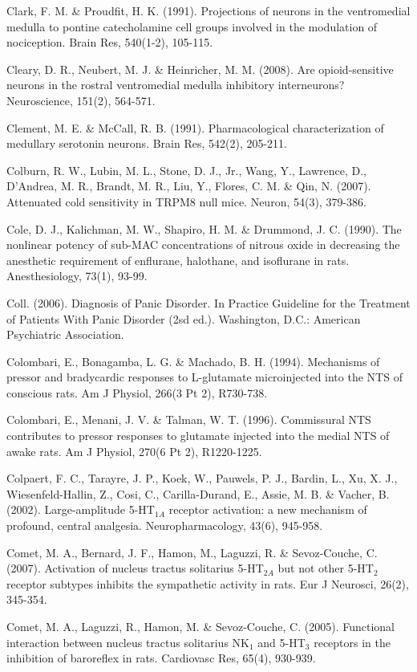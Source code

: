 \documentclass[a4paper,12pt,twoside]{report}
\begin{document}
\begin{singlespacing}
\begin{footnotesize}
Clark, F. M. \& Proudfit, H. K. (1991). Projections of neurons in the ventromedial medulla to pontine catecholamine cell groups involved in the modulation of nociception. Brain Res, 540(1-2), 105-115.

Cleary, D. R., Neubert, M. J. \& Heinricher, M. M. (2008). Are opioid-sensitive neurons in the rostral ventromedial medulla inhibitory interneurons? Neuroscience, 151(2), 564-571.

Clement, M. E. \& McCall, R. B. (1991). Pharmacological characterization of medullary serotonin neurons. Brain Res, 542(2), 205-211.

Colburn, R. W., Lubin, M. L., Stone, D. J., Jr., Wang, Y., Lawrence, D., D'Andrea, M. R., Brandt, M. R., Liu, Y., Flores, C. M. \& Qin, N. (2007). Attenuated cold sensitivity in TRPM8 null mice. Neuron, 54(3), 379-386.

Cole, D. J., Kalichman, M. W., Shapiro, H. M. \& Drummond, J. C. (1990). The nonlinear potency of sub-MAC concentrations of nitrous oxide in decreasing the anesthetic requirement of enflurane, halothane, and isoflurane in rats. Anesthesiology, 73(1), 93-99.

Coll. (2006). Diagnosis of Panic Disorder. In Practice Guideline for the Treatment of Patients With Panic Disorder (2sd ed.). Washington, D.C.: American Psychiatric Association.

Colombari, E., Bonagamba, L. G. \& Machado, B. H. (1994). Mechanisms of pressor and bradycardic responses to L-glutamate microinjected into the NTS of conscious rats. Am J Physiol, 266(3 Pt 2), R730-738.

Colombari, E., Menani, J. V. \& Talman, W. T. (1996). Commissural NTS contributes to pressor responses to glutamate injected into the medial NTS of awake rats. Am J Physiol, 270(6 Pt 2), R1220-1225.

Colpaert, F. C., Tarayre, J. P., Koek, W., Pauwels, P. J., Bardin, L., Xu, X. J., Wiesenfeld-Hallin, Z., Cosi, C., Carilla-Durand, E., Assie, M. B. \& Vacher, B. (2002). Large-amplitude 5-HT$_{1A}$ receptor activation: a new mechanism of profound, central analgesia. Neuropharmacology, 43(6), 945-958.

Comet, M. A., Bernard, J. F., Hamon, M., Laguzzi, R. \& Sevoz-Couche, C. (2007). Activation of nucleus tractus solitarius 5-HT$_{2A}$ but not other 5-HT$_{2}$ receptor subtypes inhibits the sympathetic activity in rats. Eur J Neurosci, 26(2), 345-354.

Comet, M. A., Laguzzi, R., Hamon, M. \& Sevoz-Couche, C. (2005). Functional interaction between nucleus tractus solitarius NK$_{1}$ and 5-HT$_{3}$ receptors in the inhibition of baroreflex in rats. Cardiovasc Res, 65(4), 930-939.


\end{footnotesize}
\end{singlespacing}
\end{document}
